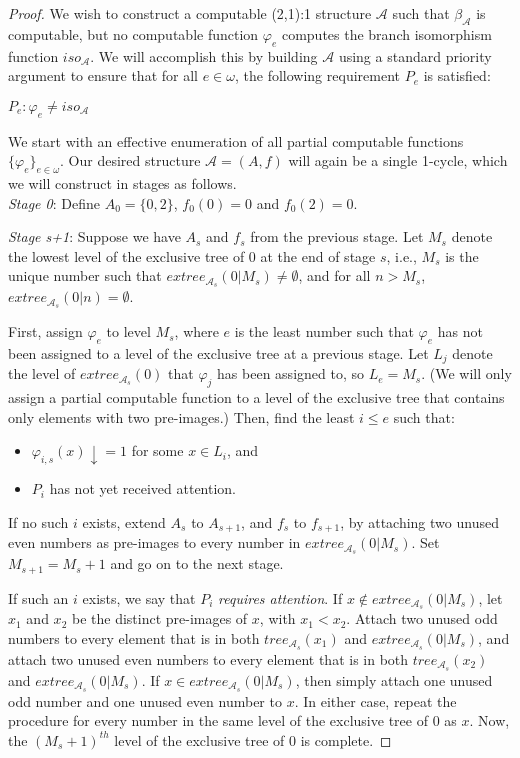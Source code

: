 \documentclass[12pt]{article}
\begin{document}
\begin{proof}
We wish to construct a computable (2,1):1 structure $\mathcal{A}$ such that $\beta_\mathcal{A}$ is computable, but no computable function $\varphi_e$ computes the branch isomorphism function $iso_\mathcal{A}$. We will accomplish this by building $\mathcal{A}$ using a standard priority argument to ensure that for all $e \in \omega$, the following requirement $P_e$ is satisfied:

\begin{center}
$P_e: \varphi_e \not= iso_\mathcal{A}$
\end{center}

We start with an effective enumeration of all partial computable functions $\{\varphi_e\}_{e \in \omega}$. Our desired structure $\mathcal{A}=(A,f)$ will again be a single 1-cycle, which we will construct in stages as follows.\\

\emph{Stage 0}: Define $A_0=\{0,2\}$, $f_0(0)=0$ and $f_0(2)=0$.

\emph{Stage s+1}: Suppose we have $A_s$ and $f_s$ from the previous stage. Let $M_s$ denote the lowest level of the exclusive tree of 0 at the end of stage $s$, i.e., $M_s$ is the unique number such that $extree_{\mathcal{A}_s}(0|M_s) \not= \emptyset$, and for all $n>M_s$, $extree_{\mathcal{A}_s}(0|n) = \emptyset$.

First, assign $\varphi_e$ to level $M_s$, where $e$ is the least number such that $\varphi_e$ has not been assigned to a level of the exclusive tree at a previous stage. Let $L_j$ denote the level of $extree_{\mathcal{A}_s}(0)$ that $\varphi_j$ has been assigned to, so $L_e=M_s$. (We will only assign a partial computable function to a level of the exclusive tree that contains only elements with two pre-images.) Then, find the least $i \leq e$ such that:

\begin{itemize}
\item $\varphi_{i,s}(x)\downarrow=1$ for some $x \in L_i$, and
\item $P_i$ has not yet received attention.
\end{itemize}

If no such $i$ exists, extend $A_s$ to $A_{s+1}$, and $f_s$ to $f_{s+1}$, by attaching two unused even numbers as pre-images to every number in $extree_{\mathcal{A}_s}(0|M_s)$. Set $M_{s+1}=M_s +1$ and go on to the next stage.

If such an $i$ exists, we say that $P_i$ \emph{requires attention}. If $x \not \in extree_{\mathcal{A}_s}(0|M_s)$, let $x_1$ and $x_2$ be the distinct pre-images of $x$, with $x_1 < x_2$. Attach two unused odd numbers to every element that is in both $tree_{\mathcal{A}_s}(x_1)$ and $extree_{\mathcal{A}_s}(0|M_s)$, and attach two unused even numbers to every element that is in both $tree_{\mathcal{A}_s}(x_2)$ and $extree_{\mathcal{A}_s}(0|M_s)$. If $x \in extree_{\mathcal{A}_s}(0|M_s)$, then simply attach one unused odd number and one unused even number to $x$. In either case, repeat the procedure for every number in the same level of the exclusive tree of $0$ as $x$. Now, the $(M_s+1)^{th}$ level of the exclusive tree of $0$ is complete.


\end{proof}
\end{document}
